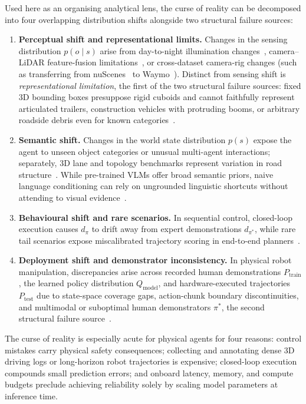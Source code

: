Used here as an organising analytical lens, the curse of reality can be decomposed into four overlapping distribution shifts alongside two structural failure sources:
\begin{enumerate}[leftmargin=*, itemsep=2pt]
  \item \textbf{Perceptual shift and representational limits.} Changes in the sensing distribution $p(o \mid s)$ arise from day-to-night illumination changes~\cite{li2023bevdevils}, camera--LiDAR feature-fusion limitations~\cite{gao2023sdf}, or cross-dataset camera-rig changes (such as transferring from nuScenes~\cite{caesar2020nuscenes} to Waymo~\cite{sun2020waymo}). Distinct from sensing shift is \emph{representational limitation}, the first of the two structural failure sources: fixed 3D bounding boxes presuppose rigid cuboids and cannot faithfully represent articulated trailers, construction vehicles with protruding booms, or arbitrary roadside debris even for known categories~\cite{sima2023occnet}.
  \item \textbf{Semantic shift.} Changes in the world state distribution $p(s)$ expose the agent to unseen object categories or unusual multi-agent interactions; separately, 3D lane and topology benchmarks represent variation in road structure~\cite{chen2022persformer,wang2023openlanev2}. While pre-trained VLMs offer broad semantic priors, naive language conditioning can rely on ungrounded linguistic shortcuts without attending to visual evidence~\cite{xie2025vlms}.
  \item \textbf{Behavioural shift and rare scenarios.} In sequential control, closed-loop execution causes $d_{\pi}$ to drift away from expert demonstrations $d_{\pi^{*}}$, while rare tail scenarios expose miscalibrated trajectory scoring in end-to-end planners~\cite{sima2024centaur}.
  \item \textbf{Deployment shift and demonstrator inconsistency.} In physical robot manipulation, discrepancies arise across recorded human demonstrations $P_{\mathrm{train}}$, the learned policy distribution $Q_{\mathrm{model}}$, and hardware-executed trajectories $P_{\mathrm{test}}$ due to state-space coverage gaps, action-chunk boundary discontinuities, and multimodal or suboptimal human demonstrators $\pi^{*}$, the second structural failure source~\cite{sima2026kai0}.
\end{enumerate}

The curse of reality is especially acute for physical agents for four reasons: control mistakes carry physical safety consequences; collecting and annotating dense 3D driving logs or long-horizon robot trajectories is expensive; closed-loop execution compounds small prediction errors; and onboard latency, memory, and compute budgets preclude achieving reliability solely by scaling model parameters at inference time.

